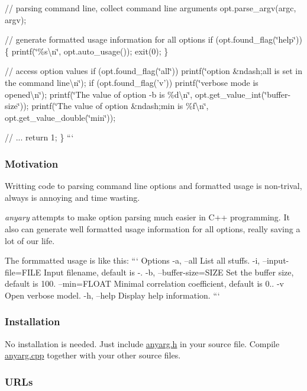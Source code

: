 // parsing command line, collect command line arguments opt.\-parse\-\_\-argv(argc, argv);

// generate formatted usage information for all options if (opt.\-found\-\_\-flag(\char`\"{}help\char`\"{})) \{ printf(\char`\"{}\%s\textbackslash{}n\char`\"{}, opt.\-auto\-\_\-usage()); exit(0); \}

// access option values if (opt.\-found\-\_\-flag(\char`\"{}all\char`\"{})) printf(\char`\"{}option \&ndash;all is set in the command line\textbackslash{}n\char`\"{}); if (opt.\-found\-\_\-flag('v')) printf(\char`\"{}verbose mode is opened\textbackslash{}n\char`\"{}); printf(\char`\"{}\-The value of option -\/b is \%d\textbackslash{}n\char`\"{}, opt.\-get\-\_\-value\-\_\-int(\char`\"{}buffer-\/size\char`\"{})); printf(\char`\"{}\-The value of option \&ndash;min is \%f\textbackslash{}n\char`\"{}, opt.\-get\-\_\-value\-\_\-double(\char`\"{}min\char`\"{}));

// ... return 1; \} ```

\subsubsection*{Motivation}

Writting code to parsing command line options and formatted usage is non-\/trival, always is annoying and time wasting.

{\itshape anyary} attempts to make option parsing much easier in C++ programming. It also can generate well formatted usage information for all options, really saving a lot of our life.

The formmatted usage is like this\-: ``` Options -\/a, --all List all stuffs. -\/i, --input-\/file=F\-I\-L\-E Input filename, default is -\/. -\/b, --buffer-\/size=S\-I\-Z\-E Set the buffer size, default is 100. --min=F\-L\-O\-A\-T Minimal correlation coefficient, default is 0.. -\/v Open verbose model. -\/h, --help Display help information. ```

\subsubsection*{Installation}

No installation is needed. Just include \hyperlink{anyarg_8h}{anyarg.\-h} in your source file. Compile \hyperlink{anyarg_8cpp}{anyarg.\-cpp} together with your other source files.

\subsubsection*{U\-R\-Ls}

